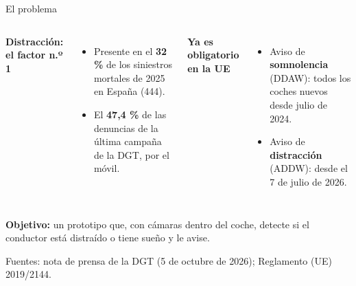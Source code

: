 \documentclass[aspectratio=169,9pt,t,xcolor={table}]{beamer}
\begin{document}
\begin{frame}{El problema}
\vspace{1mm}
\begin{columns}[T,onlytextwidth]
\textbf{Distracción: el factor n.º 1}
\vspace{1.5mm}
\begin{itemize}\setlength{\itemsep}{1.4mm}
  \item Presente en el \textbf{32 \%} de los siniestros mortales de 2025 en España (444).
  \item El \textbf{47,4 \%} de las denuncias de la última campaña de la DGT, por el móvil.
\end{itemize}
\textbf{Ya es obligatorio en la UE}
\vspace{1.5mm}
\begin{itemize}\setlength{\itemsep}{1.4mm}
  \item Aviso de \textbf{somnolencia} (DDAW): todos los coches nuevos desde julio de 2024.
  \item Aviso de \textbf{distracción} (ADDW): desde el 7 de julio de 2026.
\end{itemize}
\end{columns}

\vspace{6mm}
\begin{clave}
\color{marino}\textbf{Objetivo:} un prototipo que, con cámaras dentro del coche, detecte si el
conductor está distraído o tiene sueño y le avise.
\end{clave}

\vspace{3mm}
{\scriptsize\color{gris}Fuentes: nota de prensa de la DGT (5 de octubre de 2026); Reglamento (UE) 2019/2144.}
\end{frame}
\end{document}
